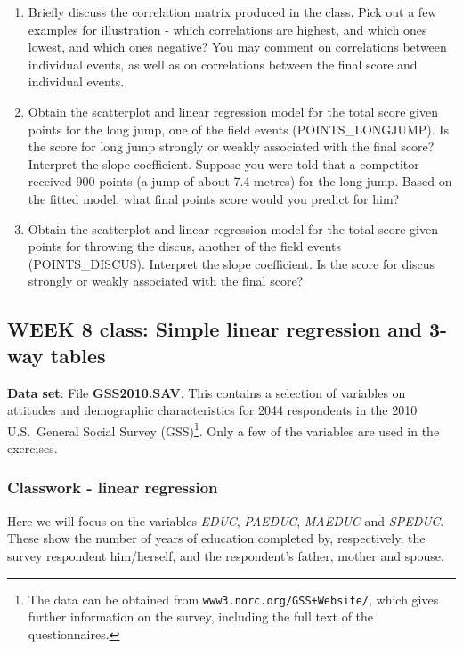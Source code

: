 \documentclass[11pt,a4paper,openany]{book}
\let\rmarkdownfootnote\footnote%
\def\footnote{\protect\rmarkdownfootnote}
\begin{document}
\begin{enumerate}
\def\labelenumi{\arabic{enumi}.}
\item
  Briefly discuss the correlation matrix produced in the class. Pick out
  a few examples for illustration - which correlations are highest, and
  which ones lowest, and which ones negative? You may comment on
  correlations between individual events, as well as on correlations
  between the final score and individual events.
\item
  Obtain the scatterplot and linear regression model for the total score
  given points for the long jump, one of the field events
  (POINTS\_LONGJUMP). Is the score for long jump strongly or weakly
  associated with the final score? Interpret the slope coefficient.
  Suppose you were told that a competitor received 900 points (a jump of
  about 7.4 metres) for the long jump. Based on the fitted model, what
  final points score would you predict for him?
\item
  Obtain the scatterplot and linear regression model for the total score
  given points for throwing the discus, another of the field events
  (POINTS\_DISCUS). Interpret the slope coefficient. Is the score for
  discus strongly or weakly associated with the final score?
\end{enumerate}

\newpage

\subsection{WEEK 8 class: Simple linear regression and 3-way
tables}\label{week-8-class-simple-linear-regression-and-3-way-tables}

\textbf{Data set}: File \textbf{GSS2010.SAV}. This contains a selection
of variables on attitudes and demographic characteristics for 2044
respondents in the 2010 U.S.~General Social Survey (GSS)\footnote{The
  data can be obtained from \texttt{www3.norc.org/GSS+Website/}, which
  gives further information on the survey, including the full text of
  the questionnaires.}. Only a few of the variables are used in the
exercises.

\subsubsection*{Classwork - linear
regression}\label{classwork---linear-regression}

Here we will focus on the variables \emph{EDUC}, \emph{PAEDUC},
\emph{MAEDUC} and \emph{SPEDUC}. These show the number of years of
education completed by, respectively, the survey respondent him/herself,
and the respondent's father, mother and spouse.
\end{document}
